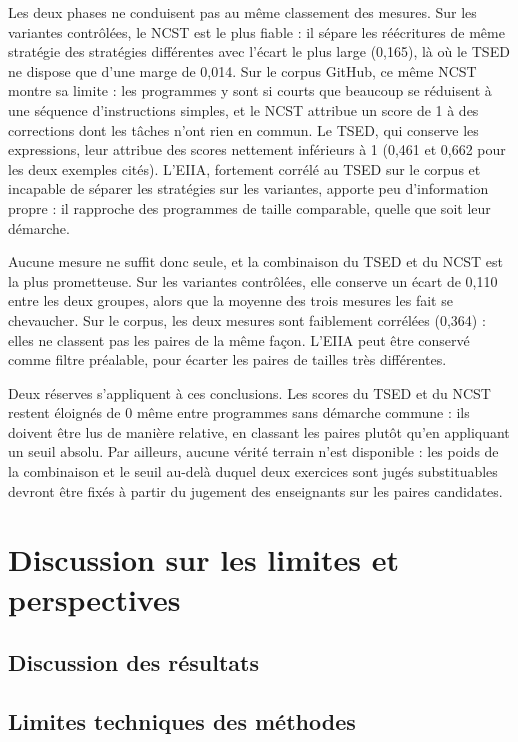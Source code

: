 \documentclass[12pt,a4paper,oneside]{report}
\begin{document}
Les deux phases ne conduisent pas au même classement des mesures. Sur les
variantes contrôlées, le NCST est le plus fiable : il sépare les réécritures
de même stratégie des stratégies différentes avec l'écart le plus large
(0,165), là où le TSED ne dispose que d'une marge de 0,014. Sur le corpus
GitHub, ce même NCST montre sa limite : les programmes y sont si courts que
beaucoup se réduisent à une séquence d'instructions simples, et le NCST
attribue un score de 1 à des corrections dont les tâches n'ont rien en
commun. Le TSED, qui conserve les expressions, leur attribue des scores
nettement inférieurs à 1 (0,461 et 0,662 pour les deux exemples cités).
L'EIIA, fortement corrélé au TSED sur le corpus et incapable de séparer les
stratégies sur les variantes, apporte peu d'information propre : il
rapproche des programmes de taille comparable, quelle que soit leur
démarche.

Aucune mesure ne suffit donc seule, et la combinaison du TSED et du NCST est
la plus prometteuse. Sur les variantes contrôlées, elle conserve un écart de
0,110 entre les deux groupes, alors que la moyenne des trois mesures les
fait se chevaucher. Sur le corpus, les deux mesures sont faiblement
corrélées (0,364) : elles ne classent pas les paires de la même façon.
L'EIIA peut être conservé comme filtre préalable, pour écarter
les paires de tailles très différentes.

Deux réserves s'appliquent à ces conclusions. Les scores du TSED et du NCST
restent éloignés de 0 même entre programmes sans démarche commune : ils
doivent être lus de manière relative, en classant les paires plutôt qu'en
appliquant un seuil absolu. Par ailleurs, aucune vérité terrain n'est disponible : les poids de la
combinaison et le seuil au-delà duquel deux exercices sont jugés
substituables devront être fixés à partir du jugement des enseignants sur
les paires candidates.



\chapter{Discussion sur les limites et perspectives}
\section{Discussion des résultats}
\section{Limites techniques des méthodes}
\end{document}
